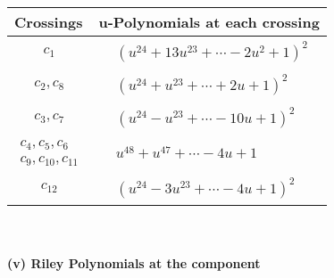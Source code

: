 \documentclass[1p]{elsarticle_modified}
\theoremstyle{definition}
\begin{document}
\begin{tabular}{m{50pt}|m{274pt}}
Crossings & \hspace{64pt}u-Polynomials at each crossing \\
\hline $$\begin{aligned}c_{1}\end{aligned}$$&$\begin{aligned}
&(u^{24}+13 u^{23}+\cdots-2 u^2+1)^{2}
\end{aligned}$\\
\hline $$\begin{aligned}c_{2},c_{8}\end{aligned}$$&$\begin{aligned}
&(u^{24}+u^{23}+\cdots+2 u+1)^{2}
\end{aligned}$\\
\hline $$\begin{aligned}c_{3},c_{7}\end{aligned}$$&$\begin{aligned}
&(u^{24}- u^{23}+\cdots-10 u+1)^{2}
\end{aligned}$\\
\hline $$\begin{aligned}c_{4},c_{5},c_{6}\\c_{9},c_{10},c_{11}\end{aligned}$$&$\begin{aligned}
&u^{48}+u^{47}+\cdots-4 u+1
\end{aligned}$\\
\hline $$\begin{aligned}c_{12}\end{aligned}$$&$\begin{aligned}
&(u^{24}-3 u^{23}+\cdots-4 u+1)^{2}
\end{aligned}$\\
\hline
\end{tabular}\\~\\
\newpage\renewcommand{\arraystretch}{1}
\flushleft \textbf{(v) Riley Polynomials at the component}\newline \\
\end{document}
